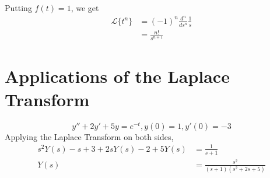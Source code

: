 \documentclass[12pt]{article}
\begin{document}
Putting $f(t) = 1$, we get
\begin{align*}
	\mathcal{L}\{t^n\} &= (-1)^n\frac{d^n}{ds^n} \frac{1}{s} \\
			   &= \frac{n!}{s^{n+1}}
\end{align*}

\section{Applications of the Laplace Transform}

\begin{ex}
	$$y'' + 2y' + 5y = e^{-t}, y(0) = 1, y'(0) = -3$$
	Applying the Laplace Transform on both sides,
	\begin{align*}
		s^2Y(s) - s + 3 + 2sY(s) - 2 + 5Y(s) &= \frac{1}{s+1} \\
		Y(s) &= \frac{s^2}{(s+1)(s^2+2s+5)}
	\end{align*}
\end{ex}
\end{document}
